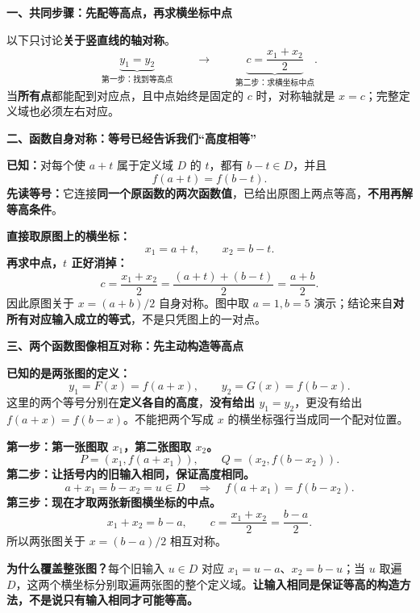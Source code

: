 \clearpage
\begin{explanationbox}
\textbf{一、共同步骤：先配等高点，再求横坐标中点}

以下只讨论\textbf{关于竖直线的轴对称}。
\[
\underbrace{y_1=y_2}_{\text{第一步：找到等高点}}
\qquad\longrightarrow\qquad
\underbrace{c=\frac{x_1+x_2}{2}}_{\text{第二步：求横坐标中点}}.
\]
当\textbf{所有点}都能配到对应点，且中点始终是固定的 $c$ 时，对称轴就是 $x=c$；完整定义域也必须左右对应。

\textbf{二、函数自身对称：等号已经告诉我们“高度相等”}


\textbf{已知：}对每个使 $a+t$ 属于定义域 $D$ 的 $t$，都有 $b-t\in D$，并且
\[\boxed{f(a+t)=f(b-t)}.\]
\textbf{先读等号：}它连接\textbf{同一个原函数的两次函数值}，已给出原图上两点等高，\textbf{不用再解等高条件}。

\textbf{直接取原图上的横坐标：}
\[x_1=a+t,\qquad x_2=b-t.\]
\textbf{再求中点，$t$ 正好消掉：}
\[c=\frac{x_1+x_2}{2}=\frac{(a+t)+(b-t)}2=\boxed{\frac{a+b}{2}}.\]
因此原图关于 $x=(a+b)/2$ 自身对称。图中取 $a=1,b=5$ 演示；结论来自\textbf{对所有对应输入成立的等式}，不是只凭图上的一对点。
\end{explanationbox}
\clearpage
\begin{explanationbox}
\textbf{三、两个函数图像相互对称：先主动构造等高点}


\textbf{已知的是两张图的定义：}
\[y_1=F(x)=f(a+x),\qquad y_2=G(x)=f(b-x).\]
这里的两个等号分别在\textbf{定义各自的高度}，\textbf{没有给出 $y_1=y_2$}，更没有给出 $f(a+x)=f(b-x)$。不能把两个写成 $x$ 的横坐标强行当成同一个配对位置。

\textbf{第一步：第一张图取 $x_1$，第二张图取 $x_2$。}
\[P=(x_1,f(a+x_1)),\qquad Q=(x_2,f(b-x_2)).\]
\textbf{第二步：让括号内的旧输入相同，保证高度相同。}
\[a+x_1=b-x_2=u\in D
\quad\Longrightarrow\quad
\boxed{f(a+x_1)=f(b-x_2)}.\]
\textbf{第三步：现在才取两张新图横坐标的中点。}
\[x_1+x_2=b-a,\qquad c=\frac{x_1+x_2}{2}=\boxed{\frac{b-a}{2}}.\]
所以两张图关于 $x=(b-a)/2$ 相互对称。

\textbf{为什么覆盖整张图？}每个旧输入 $u\in D$ 对应 $x_1=u-a$、$x_2=b-u$；当 $u$ 取遍 $D$，这两个横坐标分别取遍两张图的整个定义域。\textbf{让输入相同是保证等高的构造方法，不是说只有输入相同才可能等高。}
\end{explanationbox}
\clearpage
